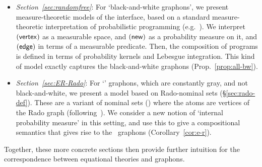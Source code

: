 \begin{itemize}
\item \emph{Section~\ref{sec:randomfree}}: For `black-and-white graphons', we present 
  measure-theoretic models of the interface, based on a standard
  measure-theoretic interpretation of probabilistic programming
  (e.g.~\cite{Kozen81}).
  We interpret $(\mathsf{vertex})$ as a measurable space, and $(\mathsf{new})$ as a
  probability measure on it, and $(\mathsf{edge})$ in terms of a measurable predicate. 
  Then, the composition of programs is defined in terms of probability
  kernels and Lebesgue integration.
  This kind of model exactly captures the black-and-white graphons (Prop.~\ref{prop:all-bw}).
\item \emph{Section~\ref{sec:ER-Rado}}: For `\ErdosRenyi' graphons, which are
  constantly gray, and not
  black-and-white, we present a model based on Rado-nominal sets (\S\ref{sec:rado-def}).
  These are a variant of nominal sets (\cite{gp-nominal,pitts-nom-book}) %
  where the atoms are vertices of
  the Rado graph (following~\cite{lmcs:1157}). We consider a new notion of `internal
  probability measure' in this setting, and use this to give a 
  compositional semantics that gives rise to the \ErdosRenyi\
  graphons (Corollary~\ref{cor:e-r}).
\end{itemize}
Together, these more concrete sections then provide further intuition for the
correspondence between equational theories and graphons. 

